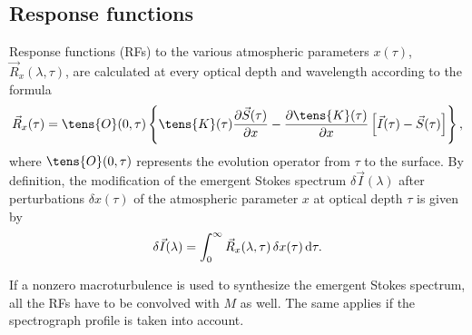 \subsection{Response functions}
Response functions (RFs) to the various atmospheric parameters $x(\tau)$,
$\vec R_x (\lambda, \tau)$, are calculated at every optical depth and
wavelength according to the formula
\begin{displaymath}
   \vec R_x (\tau) = \tens{O}(0, \tau)
   \left\{ \tens{K}(\tau) \frac {\partial \vec{S}(\tau)} {\partial x} -
   \frac {\partial \tens{K}(\tau)} {\partial x}
   \left[ \vec{I}(\tau) - \vec{S}(\tau) \right ] \right\} ,
\end{displaymath}
where $\tens{O}(0,\tau)$ represents the evolution operator from $\tau$
to the surface. By definition, the modification of the emergent Stokes
spectrum $\delta \vec{I}(\lambda)$ after perturbations $\delta x(\tau)$
of the atmospheric parameter $x$ at optical depth $\tau$ is given by
\begin{equation}
\label{defrf}
\delta \vec{I}(\lambda) = \int_0^{\infty} \vec{R}_x (\lambda, \tau) \, \delta x(\tau) \, {\rm d}\tau.
\end{equation} 

If a nonzero macroturbulence is used to synthesize the emergent Stokes
spectrum, all the RFs have to be convolved with $M$ as well. The same
applies if the spectrograph profile is taken into account.

